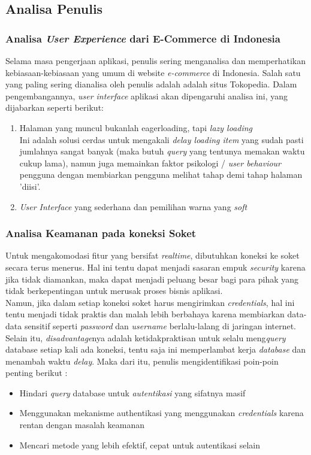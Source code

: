 
\subsection{Analisa Penulis}
	\subsubsection{Analisa \textit{User Experience} dari E-Commerce di Indonesia}
	\label{alasan-ux-ecommerce-indonesia alasan-app-serupa}
	Selama masa pengerjaan aplikasi, penulis sering menganalisa dan memperhatikan kebiasaan-kebiasaan yang umum di website \textit{e-commerce} di Indonesia. Salah satu yang paling sering dianalisa oleh penulis adalah adalah situs Tokopedia. Dalam pengembangannya, \textit{user interface} aplikasi akan dipengaruhi analisa ini, yang dijabarkan seperti berikut:
	\begin{enumerate}
		\item Halaman yang muncul bukanlah eagerloading, tapi \textit{lazy loading}\\
		\indent Ini adalah solusi cerdas untuk mengakali \textit{delay loading item} yang sudah pasti jumlahnya sangat banyak (maka butuh \textit{query} yang tentunya memakan waktu cukup lama), namun juga memainkan faktor psikologi / \textit{user behaviour} pengguna dengan membiarkan pengguna melihat tahap demi tahap halaman 'diisi'.
		\item \textit{User Interface} yang sederhana dan pemilihan warna yang \textit{soft}
	\end{enumerate}
	
	\subsubsection{Analisa Keamanan pada koneksi Soket}
	\label{alasan-socket.io}
	Untuk mengakomodasi fitur yang bersifat \textit{realtime}, dibutuhkan koneksi ke soket secara terus menerus. Hal ini tentu dapat menjadi sasaran empuk \textit{security} karena jika tidak diamankan, maka dapat menjadi peluang besar bagi para pihak yang tidak berkepentingan untuk merusak proses bisnis aplikasi.\\
	\indent Namun, jika dalam setiap koneksi soket harus mengirimkan \textit{credentials}, hal ini tentu menjadi tidak praktis dan malah lebih berbahaya karena membiarkan data-data sensitif seperti \textit{password} dan \textit{username} berlalu-lalang di jaringan internet. Selain itu, \textit{disadvantage}nya adalah ketidakpraktisan untuk selalu meng\textit{query} database setiap kali ada koneksi, tentu saja ini memperlambat kerja \textit{database} dan menambah waktu \textit{delay}. Maka dari itu, penulis mengidentifikasi poin-poin penting berikut :
		\begin{itemize}
			\item Hindari \textit{query} database untuk \textit{autentikasi} yang sifatnya masif
			\item Menggunakan mekanisme authentikasi yang menggunakan \textit{credentials} karena rentan dengan masalah keamanan
			\item Mencari metode yang lebih efektif, cepat untuk autentikasi selain 
		\end{itemize}
	
